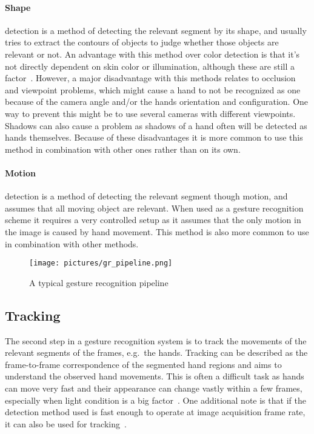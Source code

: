 \paragraph{Shape} detection is a method of detecting the relevant segment by its shape, and usually tries to extract the contours of objects to judge
whether those objects are relevant or not. An advantage with this method over color detection is that it's not directly dependent on skin color or
illumination, although these are still a factor~\citep{Rautaray2015}. However, a major disadvantage with this methods relates to occlusion and viewpoint
problems, which might cause a hand to not be recognized as one because of the camera angle and/or the hands orientation and configuration. One way to prevent this
might be to use several cameras with different viewpoints.
Shadows can also cause a problem as shadows of a hand often will be detected as hands themselves. Because of these disadvantages it is more
common to use this method in combination with other ones rather than on its own.

\paragraph{Motion} detection is a method of detecting the relevant segment though motion, and assumes that all moving object are relevant.
When used as a gesture recognition scheme it requires a very controlled setup as it assumes that the only motion in the image is caused by hand movement. 
This method is also more common to use in combination with other methods.

\begin{figure}%
	\texttt{[image: pictures/gr\_pipeline.png]}
	\caption[The gesture recognition pipeline]{A typical gesture recognition pipeline~\citep{Pisharady2015} }
	\label{fig:gr_pipeline}
\end{figure}

\subsection{Tracking}
The second step in a gesture recognition system is to track the movements of the relevant segments of the frames, e.g.~the hands. 
Tracking can be described as the frame-to-frame correspondence of the segmented hand regions and aims to understand the observed hand movements. 
This is often a difficult task as hands can move very fast and their appearance can change vastly within a few frames, 
especially when light condition is a big factor~\citep{Wang2010}. 
One additional note is that if the detection method used is fast enough to operate at image acquisition frame rate, it can also be used for tracking~\citep{Rautaray2015}.   


